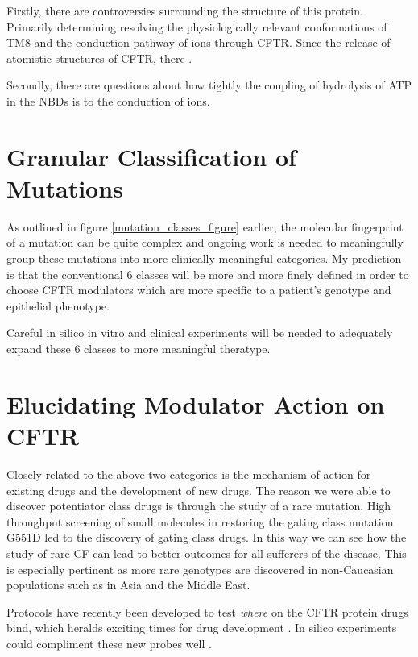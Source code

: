 Firstly, there are controversies surrounding the structure of this protein. Primarily determining resolving the physiologically relevant conformations of TM8 and the conduction pathway of ions through CFTR. Since the release of atomistic structures of CFTR, there .

Secondly, there are questions about how tightly the coupling of hydrolysis of ATP in the NBDs is to the conduction of ions.

\section{Granular Classification of Mutations}
As outlined in figure \ref{mutation_classes_figure} earlier, the molecular fingerprint of a mutation can be quite complex and ongoing work is needed to meaningfully group these mutations into more clinically meaningful categories. My prediction is that the conventional 6 classes will be more and more finely defined in order to choose CFTR modulators which are more specific to a patient's genotype and epithelial phenotype. 

Careful in silico in vitro and clinical experiments will be needed to adequately expand these 6 classes to more meaningful theratype.

\section{Elucidating Modulator Action on CFTR}
Closely related to the above two categories is the mechanism of action for existing drugs and the development of new drugs. The reason we were able to discover potentiator class drugs is through the study of a rare mutation. High throughput screening of small molecules in restoring the gating class mutation G551D led to the discovery of gating class drugs. In this way we can see how the study of rare CF can lead to better outcomes for all sufferers of the disease. This is especially pertinent as more rare genotypes are discovered in non-Caucasian populations such as in Asia and the Middle East.  

Protocols have recently been developed to test \textit{where} on the CFTR protein drugs bind, which heralds exciting times for drug development \cite{laselva2022}. In silico experiments could compliment these new probes well \cite{}.

